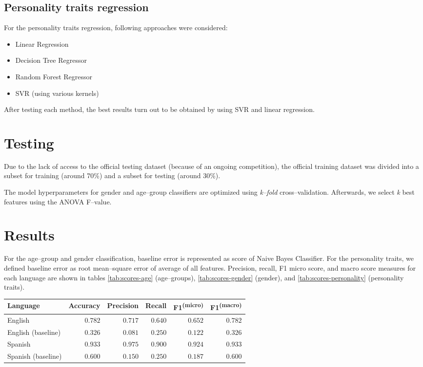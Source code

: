 \documentclass[10pt, a4paper]{article}
\begin{document}
\subsection{Personality traits regression}
For the personality traits regression, following approaches were considered:
\begin{itemize}
	\item Linear Regression
	\item Decision Tree Regressor
	\item Random Forest Regressor
	\item SVR (using various kernels)
\end{itemize}
\noindent After testing each method, the best results turn out to be obtained by using SVR and linear regression.

\section{Testing}
Due to the lack of access to the official testing dataset (because of an ongoing competition), the official training dataset was divided into a subset for training (around 70\%) and a subset for testing (around 30\%).

The model hyperparameters for gender and age--group classifiers are optimized using \textit{k--fold} cross--validation.
Afterwards, we select \textit{k} best features using the ANOVA F--value.

\section{Results}
\label{sec:results}
For the age--group and gender classification, baseline error is represented as score of Naive Bayes Classifier.
For the personality traits, we defined baseline error as root mean--square error of average of all features.
Precision, recall, F1 micro score, and macro score measures for each language are shown in tables \ref{tab:scores-age} (age--groups), \ref{tab:scores-gender} (gender), and \ref{tab:scores-personality} (personality traits).

\begin{table*}
\caption{Overview of results of age--group classification per language. Baseline scores are given for comparison}
\label{tab:scores-age}
\begin{center}
\begin{tabular}{l|rrrrr}
\toprule
Language & Accuracy & Precision & Recall & F1\textsuperscript{(micro)} & F1\textsuperscript{(macro)} \\
\midrule
English & $ 0.782 $ & $ 0.717 $ & $ 0.640 $ & $ 0.652 $ & $ 0.782 $ \\
English (baseline) &$ 0.326 $ & $ 0.081 $ & $ 0.250 $ & $ 0.122 $ & $ 0.326 $ \\
Spanish & $ 0.933 $ & $ 0.975 $ & $  0.900 $ & $ 0.924 $ & $ 0.933 $ \\
Spanish (baseline) & $  0.600 $ & $  0.150 $ & $  0.250 $ & $ 0.187 $ & $  0.600 $ \\
\bottomrule
\end{tabular}
\end{center}
\end{table*}
\end{document}
